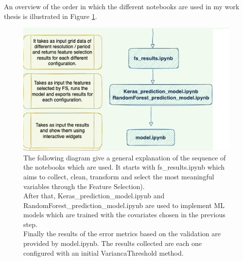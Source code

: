 An overview of the order in which the different notebooks are used in my work thesis is illustrated in Figure \ref{fig:notebooks}.
\begin{figure}[H]
    \centering
    \includegraphics[scale=0.40]{images/overview _notebooks.png}
    \caption{The following diagram give a general explanation of the sequence of the notebooks which are used. It starts with fs\_results.ipynb which aims to collect, clean, transform and select the most meaningful variables through the Feature Selection). \\
    After that, Keras\_prediction\_model.ipynb and RandomForest\_prediction\_model.ipynb are used to implement ML models which are trained with the covariates chosen in the previous step. \\
    Finally the results of the error metrics based on the validation are provided by model.ipynb. 
    The results collected are each one configured with an initial VariancaThreshold method.}
    \label{fig:notebooks}
\end{figure}